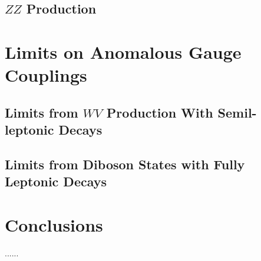 \documentclass[10pt]{article}
\begin{document}
\subsection{$ZZ$ Production}


\section{Limits on Anomalous Gauge Couplings}

\subsection{Limits from $WV$ Production With Semil-leptonic Decays}

\subsection{Limits from Diboson States with Fully Leptonic Decays}


\section{Conclusions}

...... 
\end{document}
